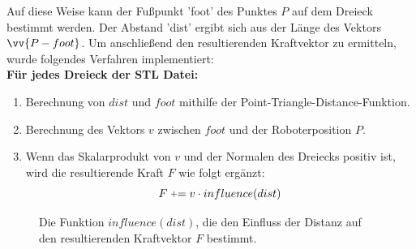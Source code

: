 \documentclass[conference]{IEEEtran}
\begin{document}
Auf diese Weise kann der Fußpunkt 'foot' des Punktes $P$ auf dem Dreieck bestimmt werden. Der Abstand 'dist' ergibt sich aus der Länge des Vektors $\vv{P - foot}$. Um anschließend den resultierenden Kraftvektor zu ermitteln, wurde folgendes Verfahren implementiert: \\
\linebreak
\textbf{Für jedes Dreieck der STL Datei:}
\begin{enumerate}
    \item Berechnung von $dist$ und $foot$ mithilfe der Point-Triangle-Distance-Funktion.
    \item Berechnung des Vektors $v$ zwischen $foot$ und der Roboterposition $P$.
    \item Wenn das Skalarprodukt von $v$ und der Normalen des Dreiecks positiv ist, wird die resultierende Kraft $F$ wie folgt ergänzt:
    \begin{equation}
        F \mathrel{\raisebox{0.19ex}{$\scriptstyle+$}}= v \cdot influence(dist)
    \end{equation}
\end{enumerate}

\begin{figure}[h]
    \centering
    \caption{Die Funktion $influence(dist)$, die den Einfluss der Distanz auf den resultierenden Kraftvektor $F$ bestimmt.}
    \label{fig:influence}
\end{figure}
\end{document}
